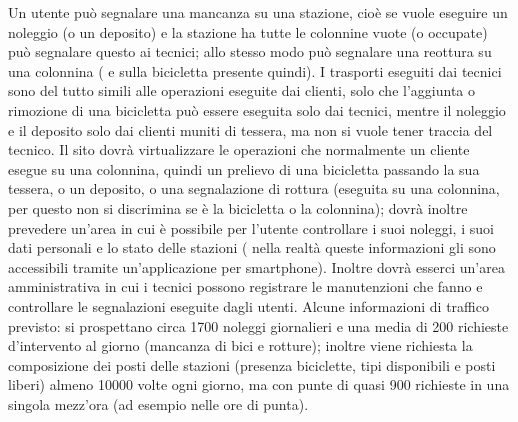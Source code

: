 \documentclass[a4paper,twoside]{article}
\begin{document}
Un utente può segnalare una mancanza su una stazione, cioè se vuole eseguire un noleggio (o un deposito) e la stazione ha tutte le colonnine vuote (o occupate) può segnalare questo ai tecnici; allo stesso modo può segnalare una reottura su una colonnina ( e sulla bicicletta presente quindi).\newline
I trasporti eseguiti dai tecnici sono del tutto simili alle operazioni eseguite dai clienti, solo che l'aggiunta o rimozione di una bicicletta può essere eseguita solo dai tecnici, mentre il noleggio e il deposito solo dai clienti muniti di tessera, ma non si vuole tener traccia del tecnico.\newline
Il sito dovrà virtualizzare le operazioni che normalmente un cliente esegue su una colonnina, quindi un prelievo di una bicicletta passando la sua tessera, o un deposito, o una segnalazione di rottura (eseguita su una colonnina, per questo non si discrimina se è la bicicletta o la colonnina); dovrà inoltre prevedere un'area in cui è possibile per l'utente controllare i suoi noleggi, i suoi dati personali e lo stato delle stazioni ( nella realtà queste informazioni gli sono accessibili tramite un'applicazione per smartphone). Inoltre dovrà esserci un'area amministrativa in cui i tecnici possono registrare le manutenzioni che fanno e controllare le segnalazioni eseguite dagli utenti.\newline
Alcune informazioni di traffico previsto: si prospettano circa 1700 noleggi giornalieri e una media di 200 richieste d'intervento al giorno (mancanza di bici e rotture); inoltre viene richiesta la composizione dei posti delle stazioni (presenza biciclette, tipi disponibili e posti liberi) almeno 10000 volte ogni giorno, ma con punte di quasi 900 richieste in una singola mezz'ora (ad esempio nelle ore di punta).
\end{document}
